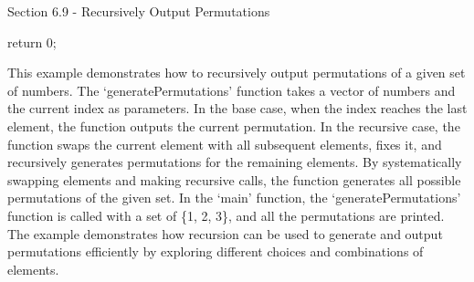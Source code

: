 \begin{notes}{Section 6.9 - Recursively Output Permutations}
\begin{highlight}
\begin{code}[C++]
{            return 0;
        }
        \end{code}
        This example demonstrates how to recursively output permutations of a given set of numbers. The `generatePermutations' function takes a vector of numbers and the current index as parameters. In the base case, when the index reaches the last element, the function outputs the current permutation. In the recursive case, the function swaps the current 
        element with all subsequent elements, fixes it, and recursively generates permutations for the remaining elements. By systematically swapping elements and making recursive calls, the function generates all possible permutations of the given set. In the `main' function, the `generatePermutations' function is called with a set of \{1, 2, 3\}, and all 
        the permutations are printed. The example demonstrates how recursion can be used to generate and output permutations efficiently by exploring different choices and combinations of elements.
    \end{highlight}
\end{notes}


